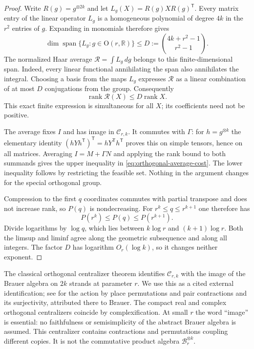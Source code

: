 \begin{proof}
Write $R(g)=g^{\otimes2k}$ and let
$L_g(X)=R(g)XR(g)^{\mathsf T}$. Every matrix entry of the
linear operator $L_g$ is a homogeneous polynomial of degree $4k$
in the $r^2$ entries of $g$. Expanding in monomials therefore gives
\[
 \dim\operatorname{span}\{L_g:g\in\mathrm O(r,\mathbb R)\}
 \le D:=\binom{4k+r^2-1}{r^2-1}.
\]
The normalized Haar average
$\mathcal R=\int L_g\,dg$ belongs to this finite-dimensional
span. Indeed, every linear functional annihilating the span also
annihilates the integral. Choosing a basis from the maps $L_g$
expresses $\mathcal R$ as a linear combination of at most $D$
conjugations from the group. Consequently
\[
 \operatorname{rank}\mathcal R(X)\le D\operatorname{rank}X.
\]
This exact finite expression is simultaneous for all $X$; its
coefficients need not be positive.

The average fixes $I$ and has image in $\mathcal C_{r,k}$.
It commutes with $\Gamma$: for $h=g^{\otimes k}$ the elementary
identity $(hYh^{\mathsf T})^{\mathsf T}=hY^{\mathsf T}h^{\mathsf T}$
proves this on simple tensors, hence on all matrices. Averaging
$I=M+\Gamma N$ and applying the rank bound to both summands gives
the upper inequality in \eqref{eq:orthogonal-average-cost}.
The lower inequality follows by restricting the feasible set.
Nothing in the argument changes for the special orthogonal group.

Compression to the first $q$ coordinates commutes with partial
transpose and does not increase rank, so $P(q)$ is nondecreasing.
For $r^k\le q\le r^{k+1}$ one therefore has
\[
 P(r^k)\le P(q)\le P(r^{k+1}).
\]
Divide logarithms by $\log q$, which lies between $k\log r$
and $(k+1)\log r$. Both the limsup and liminf agree along the
geometric subsequence and along all integers. The factor $D$
has logarithm $O_r(\log k)$, so it changes neither exponent.
\end{proof}

The classical orthogonal centralizer theorem identifies
$\mathcal C_{r,k}$ with the image of the Brauer algebra on $2k$
strands at parameter $r$. We use this as a cited external
identification; see \cite[Section~3.2 and Corollary~3.8]{LZ2012}
for the action by place permutations and pair contractions and its
surjectivity, attributed there to Brauer. The compact real and
complex orthogonal centralizers coincide by complexification.
At small $r$ the word ``image'' is essential: no faithfulness or
semisimplicity of the abstract Brauer algebra is assumed.
This centralizer contains contractions and permutations coupling
different copies. It is not the commutative product algebra
$\mathcal B_r^{\otimes k}$.

